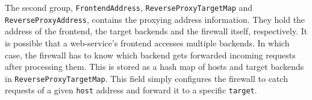 The second group, \lstinline{FrontendAddress}, \lstinline{ReverseProxyTargetMap} and \lstinline{ReverseProxyAddress}, contains the proxying address information. They hold the address of the frontend, the target backends and the firewall itself, respectively. It is possible that a web-service's frontend accesses multiple backends. In which case, the firewall has to know which backend gets forwarded incoming requests after processing them. This is stored as a hash map of hosts and target backends in \lstinline{ReverseProxyTargetMap}. This field simply configures the firewall to catch requests of a given \lstinline{host} address and forward it to a specific \lstinline{target}.







